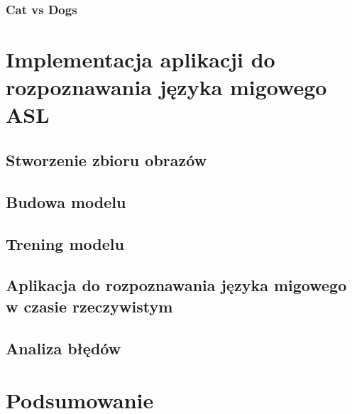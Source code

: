 \documentclass[a4paper,12pt,oneside]{book} %
\begin{document}
\subsection{Cat vs Dogs}
\label{catsdogs}
\lipsum[1]

\chapter{Implementacja aplikacji do rozpoznawania języka migowego ASL}
\lipsum[1]

\section{Stworzenie zbioru obrazów}
\lipsum[1]

\section{Budowa modelu}
\lipsum[1]

\section{Trening modelu}
\lipsum[1]

\section{Aplikacja do rozpoznawania języka migowego w czasie rzeczywistym}
\lipsum[1]

\section{Analiza błędów}
\lipsum[1]

\chapter{Podsumowanie}
\lipsum[1]
\lipsum[1]

\listoftables{} %

\listoffigures{} %

\listofcodes
{}



\end{document}
